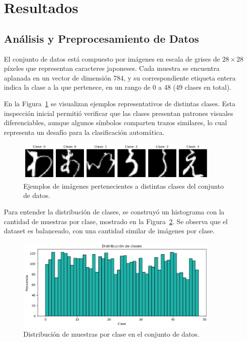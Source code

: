 \documentclass[11pt]{article}
\begin{document}
\section{Resultados}

\subsection*{Análisis y Preprocesamiento de Datos}

El conjunto de datos está compuesto por imágenes en escala de grises de \(28 \times 28\) píxeles que representan caracteres japoneses. Cada muestra se encuentra aplanada en un vector de dimensión 784, y su correspondiente etiqueta entera indica la clase a la que pertenece, en un rango de 0 a 48 (49 clases en total).

En la Figura~\ref{fig:classes} se visualizan ejemplos representativos de distintas clases. Esta inspección inicial permitió verificar que las clases presentan patrones visuales diferenciables, aunque algunos símbolos comparten trazos similares, lo cual representa un desafío para la clasificación automática.

\begin{figure}[H]
    \centering
    \includegraphics[width=0.9\textwidth]{figures/classes.png}
    \caption{Ejemplos de imágenes pertenecientes a distintas clases del conjunto de datos.}
    \label{fig:classes}
\end{figure}

Para entender la distribución de clases, se construyó un histograma con la cantidad de muestras por clase, mostrado en la Figura~\ref{fig:histogram}. Se observa que el dataset es balanceado, con una cantidad similar de imágenes por clase.

\begin{figure}[H]
    \centering
    \includegraphics[width=0.9\textwidth]{figures/class_histogram.png}
    \caption{Distribución de muestras por clase en el conjunto de datos.}
    \label{fig:histogram}
\end{figure}
\end{document}
